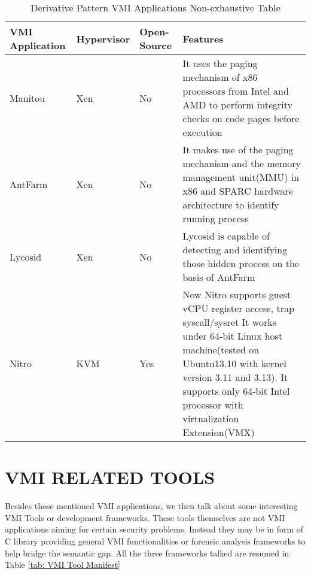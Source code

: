 
\begin{table*}[hbp]
      \centering	%
      \caption{Derivative Pattern VMI Applications Non-exhaustive Table}
      \label{tab: Derivative Pattern VMI Applications Non-exhaustive Table}      
      \begin{tabular}{| p{3cm} |p{2cm} | p{2cm} |p{6cm}|}
      \hline
      VMI Application & Hypervisor & Open-Source & Features \\ 
      \hline
      Manitou \cite{Reference40} & Xen & No & It uses the paging mechanism of x86 processors from Intel and AMD to perform integrity checks 
      on code pages before execution\\ 
      \hline
      AntFarm \cite{Reference4} & Xen & No  & It makes use of the paging mechanism and the memory management unit(MMU) 
      in x86 and SPARC hardware architecture to identify running process\\
      \hline
      Lycosid \cite{Reference9} & Xen & No & Lycosid is capable of detecting and identifying those hidden process on the basis of AntFarm\\
      \hline
      Nitro \cite{Reference8} & KVM & Yes & Now Nitro supports guest vCPU register access, trap syscall/sysret
      It works under 64-bit Linux host machine(tested on Ubuntu13.10 with kernel version 3.11 and 3.13). It supports only 64-bit Intel
      processor with virtualization Extension(VMX)\\
      \hline
      \end{tabular}
\end{table*}

\section{VMI RELATED TOOLS}

Besides those mentioned VMI applications, we then talk about some interesting VMI Tools or development frameworks. These tools 
themselves are not VMI applications aiming for certain security problems. Instead they may be in form of C library providing general 
VMI functionalities or forensic analysis frameworks to help bridge the semantic gap. All the three frameworks talked are resumed in
Table \ref{tab: VMI Tool Manifest}

